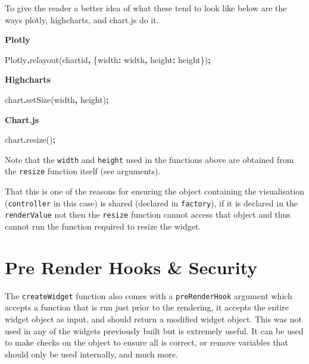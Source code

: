 \documentclass[
]{krantz}
\makeatletter
\newenvironment{Shaded}{\begin{snugshade}}{\end{snugshade}}
\newcommand{\DataTypeTok}[1]{\textcolor[rgb]{0.27,0.27,0.27}{#1}}
\newcommand{\FunctionTok}[1]{\textcolor[rgb]{0,0,0}{#1}}
\newcommand{\NormalTok}[1]{#1}
\newcommand{\OperatorTok}[1]{\textcolor[rgb]{0.43,0.43,0.43}{\textbf{#1}}}
\newcommand{\StringTok}[1]{\textcolor[rgb]{0.5,0.5,0.5}{#1}}
\newenvironment{kframe}{%
\medskip{}
\setlength{\fboxsep}{.8em}
 \def\at@end@of@kframe{}%
 \ifinner\ifhmode%
  \def\at@end@of@kframe{\end{minipage}}%
  \begin{minipage}{\columnwidth}%
 \fi\fi%
 \def\FrameCommand##1{\hskip\@totalleftmargin \hskip-\fboxsep
 \colorbox{shadecolor}{##1}\hskip-\fboxsep
     \hskip-\linewidth \hskip-\@totalleftmargin \hskip\columnwidth}%
 \MakeFramed {\advance\hsize-\width
   \@totalleftmargin\z@ \linewidth\hsize
   \@setminipage}}%
 {\par\unskip\endMakeFramed%
 \at@end@of@kframe}
\renewenvironment{Shaded}{\begin{kframe}}{\end{kframe}}
\makeatother
\begin{document}
To give the reader a better idea of what these tend to look like below are the ways plotly, highcharts, and chart.js do it.

\textbf{Plotly}

\begin{Shaded}
\begin{Highlighting}[]
\NormalTok{Plotly}\OperatorTok{.}\FunctionTok{relayout}\NormalTok{(}\StringTok{\textquotesingle{}chartid\textquotesingle{}}\OperatorTok{,}\NormalTok{ \{}\DataTypeTok{width}\OperatorTok{:}\NormalTok{ width}\OperatorTok{,} \DataTypeTok{height}\OperatorTok{:}\NormalTok{ height\})}\OperatorTok{;}
\end{Highlighting}
\end{Shaded}

\textbf{Highcharts}

\begin{Shaded}
\begin{Highlighting}[]
\NormalTok{chart}\OperatorTok{.}\FunctionTok{setSize}\NormalTok{(width}\OperatorTok{,}\NormalTok{ height)}\OperatorTok{;}
\end{Highlighting}
\end{Shaded}

\textbf{Chart.js}

\begin{Shaded}
\begin{Highlighting}[]
\NormalTok{chart}\OperatorTok{.}\FunctionTok{resize}\NormalTok{()}\OperatorTok{;}
\end{Highlighting}
\end{Shaded}

Note that the \texttt{width} and \texttt{height} used in the functions above are obtained from the \texttt{resize} function itself (see arguments).

That this is one of the reasons for ensuring the object containing the visualisation (\texttt{controller} in this case) is shared (declared in \texttt{factory}), if it is declared in the \texttt{renderValue} not then the \texttt{resize} function cannot access that object and thus cannot run the function required to resize the widget.

\hypertarget{pre-render-hooks-security}{%
\section*{Pre Render Hooks \& Security}\label{pre-render-hooks-security}}


The \texttt{createWidget} function also comes with a \texttt{preRenderHook} argument which accepts a function that is run just prior to the rendering, it accepts the entire widget object as input, and should return a modified widget object. This was not used in any of the widgets previously built but is extremely useful. It can be used to make checks on the object to ensure all is correct, or remove variables that should only be used internally, and much more.
\end{document}

